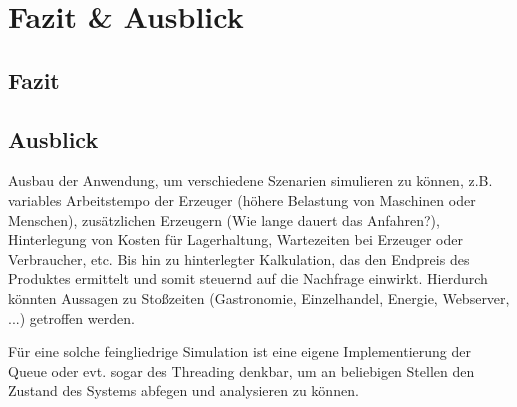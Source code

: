 \section{Fazit \& Ausblick} %
\label{sec:fazit_ausblick}

\subsection{Fazit} %
\label{sub:fazit}


\subsection{Ausblick} %
\label{sub:ausblick}
Ausbau der Anwendung, um verschiedene Szenarien simulieren zu können, z.B. variables Arbeitstempo der Erzeuger (höhere Belastung von Maschinen oder Menschen), zusätzlichen Erzeugern (Wie lange dauert das Anfahren?), Hinterlegung von Kosten für Lagerhaltung, Wartezeiten bei Erzeuger oder Verbraucher, etc. Bis hin zu hinterlegter Kalkulation, das den Endpreis des Produktes ermittelt und somit steuernd auf die Nachfrage einwirkt.
Hierdurch könnten Aussagen zu Stoßzeiten (Gastronomie, Einzelhandel, Energie, Webserver, ...) getroffen werden. 

Für eine solche feingliedrige Simulation ist eine eigene Implementierung der Queue oder evt. sogar des Threading denkbar, um an beliebigen Stellen den Zustand des Systems abfegen und analysieren zu können.


